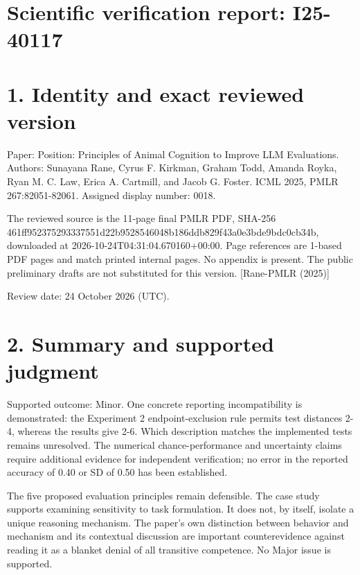\documentclass[10pt]{article}
\begin{document}
\section*{Scientific verification report: I25-40117}
\section*{1. Identity and exact reviewed version}
Paper: Position: Principles of Animal Cognition to Improve LLM Evaluations. Authors: Sunayana Rane, Cyrus F. Kirkman, Graham Todd, Amanda Royka, Ryan M. C. Law, Erica A. Cartmill, and Jacob G. Foster. ICML 2025, PMLR 267:82051-82061. Assigned display number: 0018.\par
The reviewed source is the 11-page final PMLR PDF, SHA-256 461ff952375293337551d22b9528546048b186ddb829f43a0e3bde9bdc0cb34b, downloaded at 2026-10-24T04:31:04.670160+00:00. Page references are 1-based PDF pages and match printed internal pages. No appendix is present. The public preliminary drafts are not substituted for this version. [Rane-PMLR (2025)]\par
Review date: 24 October 2026 (UTC).\par
\section*{2. Summary and supported judgment}
Supported outcome: Minor. One concrete reporting incompatibility is demonstrated: the Experiment 2 endpoint-exclusion rule permits test distances 2-4, whereas the results give 2-6. Which description matches the implemented tests remains unresolved. The numerical chance-performance and uncertainty claims require additional evidence for independent verification; no error in the reported accuracy of 0.40 or SD of 0.50 has been established.\par
The five proposed evaluation principles remain defensible. The case study supports examining sensitivity to task formulation. It does not, by itself, isolate a unique reasoning mechanism. The paper’s own distinction between behavior and mechanism and its contextual discussion are important counterevidence against reading it as a blanket denial of all transitive competence. No Major issue is supported.\par
\end{document}
